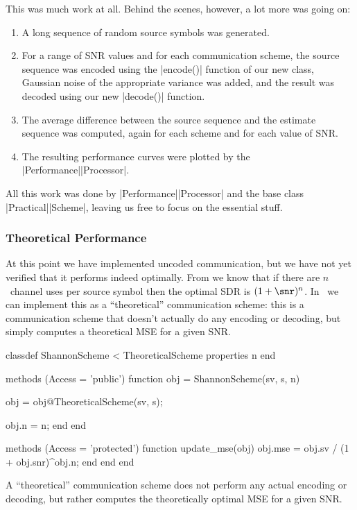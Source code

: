 This was much work at all. Behind the scenes, however, a lot more was going on:
\begin{enumerate}
  \item A long sequence of random source symbols was generated.
  \item For a range of SNR values and for each communication scheme, the source
    sequence was encoded using the |encode()| function of our new class,
    Gaussian noise of the appropriate variance was added, and the result was
    decoded using our new |decode()| function.
  \item The average difference between the source sequence and the estimate
    sequence was computed, again for each scheme and for each value of SNR. 
  \item The resulting performance curves were plotted by the
    |Performance|\-|Processor|.
\end{enumerate}
All this work was done by |Performance|\-|Processor| and the base class
|Practical|\-|Scheme|, leaving us free to focus on the essential stuff.


\subsubsection{Theoretical Performance}

At this point we have implemented uncoded communication, but we have not
yet verified that it performs indeed optimally. From  we know
that if there are $n$~channel uses per source symbol then the optimal SDR
is $(1 + \snr)^n$. In \jscsim\ we can implement this as a ``theoretical''
communication scheme: this is a communication scheme that doesn't actually do
any encoding or decoding, but simply computes a theoretical MSE for a 
given SNR.

\begin{listing}
\begin{Code}
  classdef ShannonScheme < TheoreticalScheme
    properties
      n         %
    end

    methods (Access = 'public')
      function obj = ShannonScheme(sv, s, n)
        
        obj = obj@TheoreticalScheme(sv, s);

        obj.n = n;
      end
    end

    methods (Access = 'protected')
      function update_mse(obj)
          obj.mse = obj.sv / (1 + obj.snr)^obj.n;
      end
    end
  end
\end{Code}
  \caption{A ``theoretical'' communication scheme does not perform any
  actual encoding or decoding, but rather computes the theoretically optimal MSE
  for a given SNR.}
  \label{lst:shannonscheme}
\end{listing}


